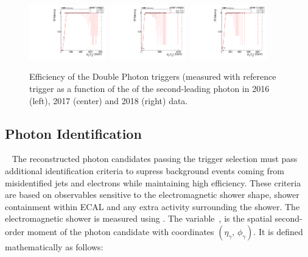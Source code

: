 \begin{figure}[tbp!]
\begin{center}
\includegraphics[angle=0,width=0.3\textwidth]{fig/eff_2016_Photon2_pt.pdf}
\includegraphics[angle=0,width=0.3\textwidth]{fig/eff_2017_Photon2_pt.pdf}
\includegraphics[angle=0,width=0.3\textwidth]{fig/eff_2018_Photon2_pt.pdf}
\end{center}
\caption{Efficiency of the Double Photon triggers (measured with reference trigger as a function of the \pt of the second-leading photon in 2016 (left), 2017 (center) and 2018 (right) data.}
\label{fig:trigger_efficiency}
\end{figure}


\subsection{Photon Identification}~\label{subsec:photonID}
The reconstructed photon candidates passing the trigger selection must pass additional identification criteria to supress background events coming from misidentified jets and electrons while maintaining high efficiency. These criteria are based on observables sensitive to the electromagnetic shower shape, shower containment within ECAL and any extra activity surrounding the shower. The electromagnetic shower is  measured using \sieie. The \sieie variable~\cite{Khachatryan:2015iwa}, is the spatial second-order moment of the photon candidate with coordinates $(\eta_\gamma,\,\phi_\gamma)$. It is defined mathematically as follows:

